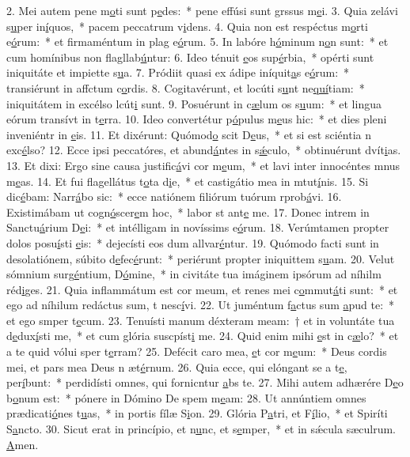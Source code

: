 2. Mei autem pene m\uline{o}ti sunt p\uline{e}des:~* pene effúsi sunt grssus m\uline{e}i.
3. Quia zelávi s\uline{u}per in\uline{í}quos,~* pacem peccatrum v\uline{i}dens.
4. Quia non est respéctus m\uline{o}rti e\uline{ó}rum:~* et firmaméntum in plag e\uline{ó}rum.
5. In labóre h\uline{ó}minum n\uline{o}n sunt:~* et cum homínibus non flagllab\uline{ú}ntur:
6. Ideo ténuit \uline{e}os sup\uline{é}rbia,~* opérti sunt iniquitáte et impiette s\uline{u}a.
7. Pródiit quasi ex ádipe iníquit\uline{a}s e\uline{ó}rum:~* transiérunt in affctum c\uline{o}rdis.
8. Cogitavérunt, et locúti s\uline{u}nt ne\uline{quí}tiam:~* iniquitátem in excélso lcút\uline{i} sunt.
9. Posuérunt in c\uline{æ}lum os s\uline{u}um:~* et lingua eórum transívt in t\uline{e}rra.
10. Ideo convertétur p\uline{ó}pulus m\uline{e}us hic:~* et dies pleni inveniéntr in \uline{e}is.
11. Et dixérunt: Quómod\uline{o} scit D\uline{e}us,~* et si est sciéntia n exc\uline{é}lso?
12. Ecce ipsi peccatóres, et abund\uline{á}ntes in s\uline{ǽ}culo,~* obtinuérunt dvít\uline{i}as.
13. Et dixi: Ergo sine causa justific\uline{á}vi cor m\uline{e}um,~* et lavi inter innocéntes mnus m\uline{e}as.
14. Et fui flagellátus t\uline{o}ta d\uline{i}e,~* et castigátio mea in mtut\uline{í}nis.
15. Si dic\uline{é}bam: Narr\uline{á}bo sic:~* ecce natiónem filiórum tuórum rprob\uline{á}vi.
16. Existimábam ut cogn\uline{ó}scer\uline{e}m hoc,~* labor st ant\uline{e} me.
17. Donec intrem in Sanctu\uline{á}rium D\uline{e}i:~* et intélligam in novíssims e\uline{ó}rum.
18. Verúmtamen propter dolos posu\uline{í}sti \uline{e}is:~* dejecísti eos dum allvar\uline{é}ntur.
19. Quómodo facti sunt in desolatiónem, súbito d\uline{e}fec\uline{é}runt:~* periérunt propter iniquittem s\uline{u}am.
20. Velut sómnium surg\uline{é}ntium, D\uline{ó}mine,~* in civitáte tua imáginem ipsórum ad níhilm réd\uline{i}ges.
21. Quia inflammátum est cor meum, et renes mei c\uline{o}mmut\uline{á}ti sunt:~* et ego ad níhilum redáctus sum, t nesc\uline{í}vi.
22. Ut juméntum f\uline{a}ctus sum \uline{a}pud te:~* et ego smper t\uline{e}cum.
23. Tenuísti manum déxteram meam:~† et in voluntáte tua d\uline{e}dux\uline{í}sti me,~* et cum glória suscpíst\uline{i} me.
24. Quid enim mihi \uline{e}st in c\uline{æ}lo?~* et a te quid vólui sper t\uline{e}rram?
25. Defécit caro mea, \uline{e}t cor m\uline{e}um:~* Deus cordis mei, et pars mea Deus n æt\uline{é}rnum.
26. Quia ecce, qui elóngant se a t\uline{e}, per\uline{í}bunt:~* perdidísti omnes, qui fornicntur \uline{a}bs te.
27. Mihi autem adhærére D\uline{e}o b\uline{o}num est:~* pónere in Dómino De spem m\uline{e}am:
28. Ut annúntiem omnes prædicati\uline{ó}nes t\uline{u}as,~* in portis fílæ S\uline{i}on.
29. Glória P\uline{a}tri, et F\uline{í}lio,~* et Spiríti S\uline{a}ncto.
30. Sicut erat in princípio, et n\uline{u}nc, et s\uline{e}mper,~* et in sǽcula sæculrum. \uline{A}men.
